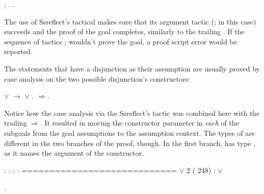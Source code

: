 \begin{coqdoccode}
\coqdocemptyline
\coqdocnoindent
{} ; .\coqdoceol
\coqdocnoindent
{}.\coqdoceol
\coqdocemptyline
\end{coqdoccode}


The use of Ssreflect's tactical  makes sure that its
argument tactic (;  in this case) succeeds and the proof of
the goal completes, similarly to the trailing . If the sequence
of tactics ;  wouldn't prove the goal, a proof script error
would be reported.


The statements that have a disjunction as their assumption are usually
proved by case analysis on the two possible disjunction's
constructors:


\begin{coqdoccode}
\coqdocemptyline
\coqdocnoindent
{}  \ensuremath{\lor}  \ensuremath{\rightarrow}  \ensuremath{\lor} .\coqdoceol
\coqdocnoindent
{}\ensuremath{\Rightarrow}.\coqdoceol
\coqdocemptyline
\end{coqdoccode}


Notice how the case analysis via the Ssreflect's  tactic was
combined here with the trailing \ensuremath{\Rightarrow}. It resulted in moving the
constructor parameter in \textit{each} of the subgoals from the goal
assumptions to the assumption context. The types of  are different
in the two branches of the proof, though. In the first branch,  has
type , as it names the argument of the  constructor.


\coqdoceol
\coqdocemptyline
\coqdocindent{1.00em}
 : \coqdoceol
\coqdocindent{1.00em}
 : \coqdoceol
\coqdocindent{1.00em}
 : \coqdoceol
\coqdocindent{1.00em}
 : \coqdoceol
\coqdocindent{1.00em}
============================\coqdoceol
\coqdocindent{1.50em}
 \ensuremath{\lor} \coqdoceol
\coqdocnoindent
\coqdoceol
\coqdocnoindent
{} 2 ( 248) :\coqdoceol
\coqdocindent{0.50em}
 \ensuremath{\lor} 

\coqdocemptyline
\begin{coqdoccode}
\coqdocemptyline
\coqdocnoindent
{} .\coqdoceol
\coqdocemptyline
\end{coqdoccode}


